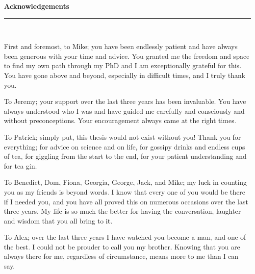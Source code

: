 \thispagestyle{empty}
\begin{raggedleft}
\vspace*{23mm}
\hfill {\huge {\bf {Acknowledgements}}} \\
\vspace{6mm}
\hfill \rule{4in}{.015in} \\
\vspace{19mm}
\end{raggedleft}



First and foremost, to Mike;  you have been endlessly patient and have always been generous with your time and advice.  You granted me the freedom and space to find my own path through my PhD and I am exceptionally grateful for this.  You have gone above and beyond, especially in difficult times, and I truly thank you.

To Jeremy; your support over the last three years has been invaluable. You have always understood who I was and have guided me carefully and consciously and without preconceptions.    Your encouragement always came at the right times.  

To Patrick; simply put, this thesis would not exist without you!  Thank you for everything; for advice on science and on life, for gossipy drinks and endless cups of tea, for giggling from the start to the end, for your patient understanding and for tea gin. 

To 
Benedict,
Dom,
Fiona,
Georgia,
George,
Jack,
and 
Mike;  my luck in counting you as my friends is beyond words.  I know that every one of you would be there if I needed you, and you have all proved this on numerous occasions over the last three years.  My life is so much the better for having the conversation, laughter and wisdom that you all bring to it.

To Alex;  over the last three years I have watched you become a man, and one of the best.  I could not be prouder to call you my brother.  Knowing that you are always there for me, regardless of circumstance, means more to me than I can say. 

